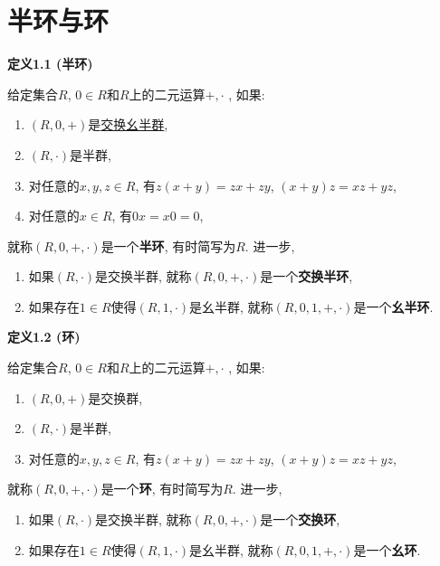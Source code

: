 \documentclass[UTF8]{ctexart}
\begin{document}
\setlength{\abovedisplayskip}{1pt}
\setlength{\belowdisplayskip}{1pt}

\section{半环与环}

\hypertarget{sec:定义1.1}{}
\noindent\textbf{定义1.1 (半环)}

给定集合$R$, $0\in R$和$R$上的二元运算$+,\cdot$ , 如果:
\begin{enumerate}
    \item $(R,0,+)$是\href{../../01 群论/01 半群与群#nameddest=sec:定义1.1}{交换幺半群},
    \item $(R,\cdot)$是半群,
    \item 对任意的$x,y,z\in R$, 有$z(x+y)=zx+zy$, $(x+y)z=xz+yz$,
    \item 对任意的$x\in R$, 有$0x=x0=0$,
\end{enumerate}
就称$(R,0,+,\cdot)$是一个\textbf{半环}, 有时简写为$R$. 进一步,
\begin{enumerate}
    \item 如果$(R,\cdot)$是交换半群, 就称$(R,0,+,\cdot)$是一个\textbf{交换半环},
    \item 如果存在$1\in R$使得$(R,1,\cdot)$是幺半群,
    就称$(R,0,1,+,\cdot)$是一个\textbf{幺半环}.
\end{enumerate}

\vspace{10pt}

\hypertarget{sec:定义1.2}{}
\noindent\textbf{定义1.2 (环)}

给定集合$R$, $0\in R$和$R$上的二元运算$+,\cdot$ , 如果:
\begin{enumerate}
    \item $(R,0,+)$是交换群,
    \item $(R,\cdot)$是半群,
    \item 对任意的$x,y,z\in R$, 有$z(x+y)=zx+zy$, $(x+y)z=xz+yz$,
\end{enumerate}
就称$(R,0,+,\cdot)$是一个\textbf{环}, 有时简写为$R$. 进一步,
\begin{enumerate}
    \item 如果$(R,\cdot)$是交换半群, 就称$(R,0,+,\cdot)$是一个\textbf{交换环},
    \item 如果存在$1\in R$使得$(R,1,\cdot)$是幺半群,
    就称$(R,0,1,+,\cdot)$是一个\textbf{幺环}.
\end{enumerate}

\vspace{10pt}
\end{document}
